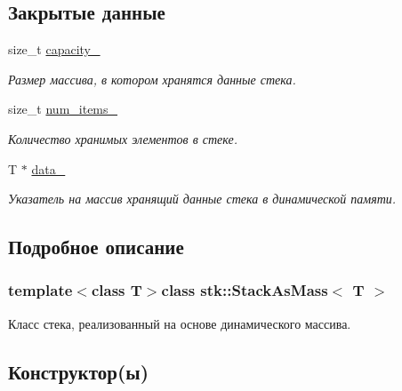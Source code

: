 \subsection*{Закрытые данные}
\begin{DoxyCompactItemize}
\item 
size\+\_\+t \hyperlink{classstk_1_1_stack_as_mass_aa03eca24b4a73e040690da8a14ffef8b}{capacity\+\_\+}
\begin{DoxyCompactList}\small\item\em Размер массива, в котором хранятся данные стека. \end{DoxyCompactList}\item 
size\+\_\+t \hyperlink{classstk_1_1_stack_as_mass_a5e9451aac734a824c73b3d7054093fef}{num\+\_\+items\+\_\+}
\begin{DoxyCompactList}\small\item\em Количество хранимых элементов в стеке. \end{DoxyCompactList}\item 
T $\ast$ \hyperlink{classstk_1_1_stack_as_mass_a15bf94917c32ed7f450f22de28d14467}{data\+\_\+}
\begin{DoxyCompactList}\small\item\em Указатель на массив хранящий данные стека в динамической памяти. \end{DoxyCompactList}\end{DoxyCompactItemize}


\subsection{Подробное описание}
\subsubsection*{template$<$class T$>$class stk\+::\+Stack\+As\+Mass$<$ T $>$}

Класс стека, реализованный на основе динамического массива. 

\subsection{Конструктор(ы)}
\hypertarget{classstk_1_1_stack_as_mass_aa5dca4927f4cf652cacd3741a45eb2ad}{}
